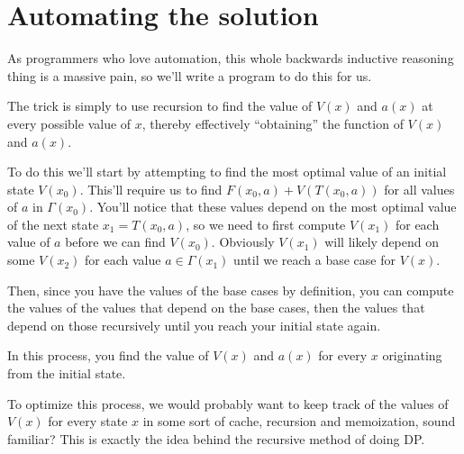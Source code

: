 \documentclass[a4paper, 12pt]{article}
\begin{document}
\section{Automating the solution}

As programmers who love automation, this whole backwards inductive
reasoning thing is a massive pain, so we'll write a program to do
this for us.

The trick is simply to use recursion to find the value of $V(x)$
and $a(x)$ at every possible value of $x$, thereby effectively
``obtaining'' the function of $V(x)$ and $a(x)$.

To do this we'll start by attempting to find the most optimal
value of an initial state $V(x_{0})$. This'll require us to find
$F(x_{0}, a) + V(T(x_{0}, a))$ for all values of $a$ in
$\Gamma(x_{0})$. You'll notice that these values depend on the
most optimal value of the next state $x_{1} = T(x_{0}, a)$, so we
need to first compute $V(x_{1})$ for each value of $a$ before we
can find $V(x_{0})$. Obviously $V(x_{1})$ will likely depend on
some $V(x_{2})$ for each value $a \in \Gamma(x_{1})$ until we
reach a base case for $V(x)$.

\begin{center}
\end{center}

Then, since you have the values of the base cases by definition,
you can compute the values of the values that depend on the base
cases, then the values that depend on those recursively until you
reach your initial state again.

In this process, you find the value of $V(x)$ and $a(x)$ for every
$x$ originating from the initial state.

To optimize this process, we would probably want to keep track of
the values of $V(x)$ for every state $x$ in some sort of cache,
recursion and memoization, sound familiar? This is exactly the
idea behind the recursive method of doing DP.
\end{document}
